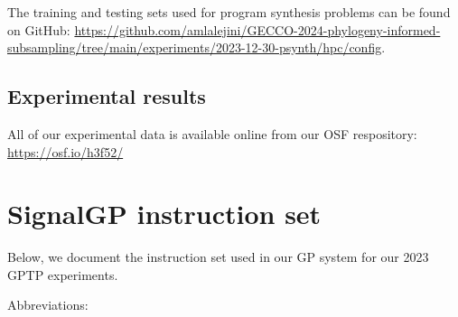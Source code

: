 \documentclass[
]{book}
\begin{document}
The training and testing sets used for program synthesis problems can be found on GitHub:
\url{https://github.com/amlalejini/GECCO-2024-phylogeny-informed-subsampling/tree/main/experiments/2023-12-30-psynth/hpc/config}.

\hypertarget{experimental-results}{%
\section{Experimental results}\label{experimental-results}}

All of our experimental data is available online from our OSF respository: \url{https://osf.io/h3f52/}

\hypertarget{signalgp-instruction-set}{%
\chapter{SignalGP instruction set}\label{signalgp-instruction-set}}

Below, we document the instruction set used in our GP system for our 2023 GPTP experiments.

Abbreviations:
\end{document}
